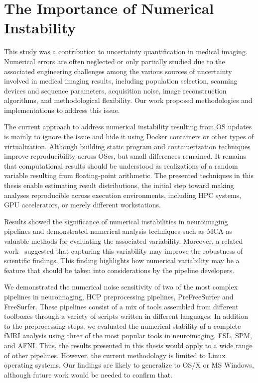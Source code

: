 \section{The Importance of Numerical Instability}

This study was a contribution to uncertainty quantification in medical imaging.
Numerical errors are often neglected or only partially studied due to the associated engineering challenges among
the various sources of uncertainty involved in medical imaging results, including population selection,
scanning devices and sequence parameters, acquisition noise, image reconstruction algorithms, and methodological flexibility.
Our work proposed methodologies and implementations to address this issue.

The current approach to address numerical instability resulting from OS
updates is mainly to ignore the issue and hide it using %
Docker containers or other types of virtualization.
Although building static program and containerization techniques improve
reproducibility across OSes, but small differences remained.
It remains that computational results should be understood as realizations of a random variable resulting
from floating-point arithmetic. The presented techniques in this thesis enable estimating
result distributions, the initial step toward making analyses reproducible across
execution environments, including HPC systems, GPU accelerators, or merely
different workstations.

Results showed the significance of numerical instabilities in neuroimaging pipelines
and demonstrated numerical analysis techniques such as MCA as valuable methods for evaluating the associated variability. 
Moreover, a related work~\cite{kiar2020numerical} suggested that capturing this variability may improve the robustness of scientific
findings. This finding highlights how numerical variability may be a feature that should be
taken into considerations by the pipeline developers.

We demonstrated the numerical noise sensitivity of two of the most complex pipelines in neuroimaging,
HCP preprocessing pipelines, PreFreeSurfer and FreeSurfer. These pipelines consist of a mix of tools
assembled from different toolboxes through a variety of scripts written in different languages. In addition to the preprocessing steps,
we evaluated the numerical stability of a complete fMRI analysis using three of the most popular tools in neuroimaging, FSL, SPM, and AFNI.
Thus, the results presented in this thesis would apply to a wide range of other pipelines. 
However, the current methodology is limited to Linux operating systems. 
Our findings are likely to generalize to OS/X or MS Windows, although future work would be needed to confirm that.

